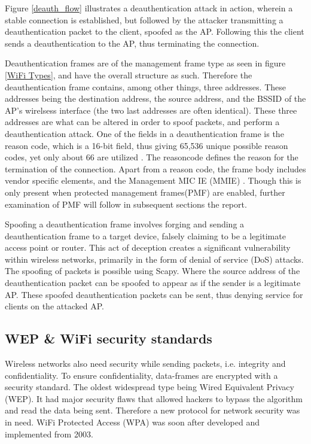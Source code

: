 Figure \ref{deauth_flow} illustrates a deauthentication attack in action, wherein a stable connection is established, but followed by the attacker transmitting a deauthentication packet to the client, spoofed as the AP. Following this the client sends a deauthentication to the AP, thus terminating the connection.

Deauthentication frames are of the management frame type as seen in figure \ref{WiFi Types}, and have the overall structure as such. Therefore the deauthentication frame contains, among other things, three addresses. These addresses being the destination address, the source address, and the BSSID of the AP's wirelsess interface (the two last addresses are often identical). These three addresses are what can be altered in order to spoof packets, and perform a deauthentication attack. One of the fields in a deauthentication frame is the reason code, which is a 16-bit field, thus giving 65,536 unique possible reason codes, yet only about 66 are utilized \cite{Cisco_Deathentication_reasoncodes}. The reasoncode defines the reason for the termination of the connection. Apart from a reason code, the frame body includes vendor specific elements, and the Management MIC IE (MMIE) \cite{IEEE_802.11w}. Though this is only present when protected management frames(PMF) are enabled, further examination of PMF will follow in subsequent sections the report.

Spoofing a deauthentication frame involves forging and sending a deauthentication frame to a target device, falsely claiming to be a legitimate access point or router. This act of deception creates a significant vulnerability within wireless networks, primarily in the form of denial of service (DoS) attacks. The spoofing of packets is possible using Scapy. Where the source address of the deauthentication packet can be spoofed to appear as if the sender is a legitimate AP.
These spoofed deauthentication packets can be sent, thus denying service for clients on the attacked AP.

\subsection{WEP \& WiFi security standards}
Wireless networks also need security while sending packets, i.e. integrity and confidentiality. To ensure confidentiality, data-frames are encrypted with a security standard. The oldest widespread type being Wired Equivalent Privacy (WEP). It had major security flaws that allowed hackers to bypass the algorithm and read the data being sent\cite{WEP1}. Therefore a new protocol for network security was in need. WiFi Protected Access (WPA) was soon after developed and implemented from 2003\cite{WEP3}. 

